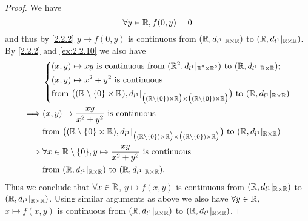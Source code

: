 \begin{proof}
  We have
  \[
    \forall y \in \mathbb{R}, f(0, y) = 0
  \]
  and thus by \cref{2.2.2} \(y \mapsto f(0, y)\) is continuous from \((\mathbb{R}, d_{l^1}|_{\mathbb{R} \times \mathbb{R}})\) to \((\mathbb{R}, d_{l^1}|_{\mathbb{R} \times \mathbb{R}})\).
  By \cref{2.2.2} and \cref{ex:2.2.10} we also have
  \begin{align*}
             & \begin{dcases}
                 (x, y) \mapsto x y \text{ is continuous from } (\R^2, d_{l^1}|_{\R^2 \times \R^2}) \text{ to } (\R, d_{l^1}|_{\R \times \R}); \\
                 (x, y) \mapsto x^2 + y^2 \text{ is continuous}                                                                                \\
                 \text{from } \big((\R \setminus \set{0} \times \R), d_{l^1}|_{\big((\R \setminus \set{0}) \times \R\big) \times \big((\R \setminus \set{0}) \times \R\big)}\big) \text{ to } (\R, d_{l^1}|_{\R \times \R})
               \end{dcases}  \\
    \implies & (x, y) \mapsto \dfrac{xy}{x^2 + y^2} \text{ is continuous}                                                                                                                                                 \\
             & \text{from } \big((\R \setminus \set{0} \times \R), d_{l^1}|_{\big((\R \setminus \set{0}) \times \R\big) \times \big((\R \setminus \set{0}) \times \R\big)}\big) \text{ to } (\R, d_{l^1}|_{\R \times \R}) \\
    \implies & \forall x \in \R \setminus \set{0}, y \mapsto \dfrac{xy}{x^2 + y^2} \text{ is continuous}                                                                                                                  \\
             & \text{from } (\R, d_{l^1}|_{\R \times \R}) \text{ to } (\R, d_{l^1}|_{\R \times \R}).
  \end{align*}
  Thus we conclude that \(\forall x \in \mathbb{R}\), \(y \mapsto f(x, y)\) is continuous from \((\mathbb{R}, d_{l^1}|_{\mathbb{R} \times \mathbb{R}})\) to \((\mathbb{R}, d_{l^1}|_{\mathbb{R} \times \mathbb{R}})\).
  Using similar arguments as above we also have \(\forall y \in \mathbb{R}\), \(x \mapsto f(x, y)\) is continuous from \((\mathbb{R}, d_{l^1}|_{\mathbb{R} \times \mathbb{R}})\) to \((\mathbb{R}, d_{l^1}|_{\mathbb{R} \times \mathbb{R}})\).


\end{proof}
